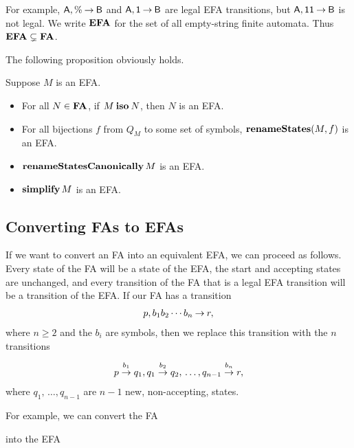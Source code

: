 For example, $\mathsf{A},\%\mathbin{\to}\mathsf{B}$ and $\mathsf{A},\mathsf{1}\mathbin{\to}\mathsf{B}$ are legal EFA
transitions, but $\mathsf{A},\mathsf{1}\mathsf{1}\mathbin{\to}\mathsf{B}$ is not legal.  We write
%
%
%
$\mathbf{EFA}$ for the set of all empty-string finite automata.  Thus
$\mathbf{EFA}\subsetneq\mathbf{FA}$.

The following proposition obviously holds.

\begin{proposition}
Suppose $M$ is an EFA.
\begin{itemize}
\item For all $N\in\mathbf{FA}$, if $M\mathbin{\mathbf{iso}} N$, then $N$ is an EFA.

\item For all bijections $f$ from $Q_M$ to some set of symbols,
  $\mathbf{renameStates}(M, f)$ is an EFA.

\item $\mathbf{renameStatesCanonically}\,M$ is an EFA.

\item $\mathbf{simplify}\,M$ is an EFA.
\end{itemize}
\end{proposition}

\subsection{Converting FAs to EFAs}

%
%
If we want to convert an FA into an equivalent EFA, we can proceed as
follows.  Every state of the FA will be a state of the EFA, the start
and accepting states are unchanged, and every transition of the FA
that is a legal EFA transition will be a transition
of the EFA.  If our FA has a transition
\begin{gather*}
p, b_1b_2\cdots b_n\mathbin{\to} r,
\end{gather*}
where $n\geq 2$ and the $b_i$ are symbols, then we replace this
transition with the $n$ transitions
\begin{gather*}
p\stackrel{\strut b_1}{\rightarrow}q_1, q_1\stackrel{\strut b_2}{\rightarrow}q_2,\,\ldots, q_{n-1}\stackrel{\strut b_n}{\rightarrow}r,
\end{gather*}
where $q_1,\,\ldots,q_{n-1}$ are $n-1$ new, non-accepting, states.

For example, we can convert the FA
\begin{center}

\end{center}
into the EFA
\begin{center}

\end{center}

